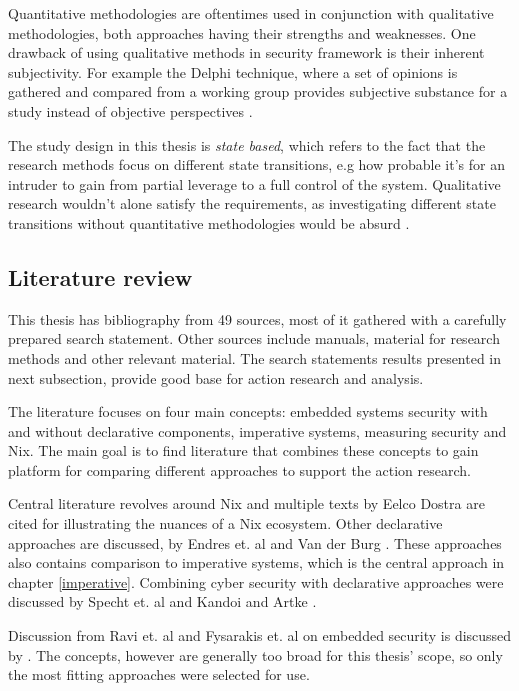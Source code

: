 Quantitative methodologies are oftentimes used in conjunction with
qualitative methodologies, both approaches having their strengths and
weaknesses. One drawback of using qualitative methods in security
framework is their inherent subjectivity. For example the Delphi
technique, where a set of opinions is gathered and compared from a
working group provides subjective substance for a study instead of
objective perspectives \cite{wang2005information}.

The study design in this thesis is \textit{state based}, which refers
to the fact that the research methods focus on different state
transitions, e.g how probable it's for an intruder to gain from
partial leverage to a full control of the system. Qualitative research
wouldn't alone satisfy the requirements, as investigating different
state transitions without quantitative methodologies would be absurd
\cite{ramos2017model}.

\subsection{Literature review}\label{litrev}

This thesis has bibliography from 49 sources, most of it gathered with
a carefully prepared search statement. Other sources include manuals,
material for research methods and other relevant material. The search
statements results presented in next subsection, provide good base
for action research and analysis.

The literature focuses on four main concepts: embedded systems
security with and without declarative components, imperative systems,
measuring security and Nix. The main goal is to find literature that
combines these concepts to gain platform for comparing different
approaches to support the action research.

Central literature revolves around Nix and multiple texts by Eelco
Dostra are cited for illustrating the nuances of a Nix
ecosystem. Other declarative approaches are discussed, by Endres
et. al and Van der Burg \cite{van2010declarative,
  endres2017declarative}. These approaches also contains comparison to
imperative systems, which is the central approach in chapter
\ref{imperative}. Combining cyber security with declarative approaches
were discussed by Specht et. al and Kandoi and Artke
\cite{specht2007analysis, kandoi2021operating}.

Discussion from Ravi et. al and Fysarakis et. al on embedded security
is discussed by \cite{ravi2004security, fysarakis2014embedded}. The
concepts, however are generally too broad for this thesis' scope, so
only the most fitting approaches were selected for use.

